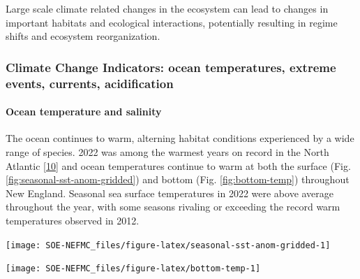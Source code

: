 \documentclass[
  10pt,
]{article}
\let\origfigure\figure
\let\endorigfigure\endfigure
\renewenvironment{figure}[1][2] {
    \expandafter\origfigure\expandafter[H]
} {
    \endorigfigure
}
\begin{document}
Large scale climate related changes in the ecosystem can lead to changes in important habitats and ecological interactions, potentially resulting in regime shifts and ecosystem reorganization.

\hypertarget{climate-change-indicators-ocean-temperatures-extreme-events-currents-acidification}{%
\subsubsection{Climate Change Indicators: ocean temperatures, extreme events, currents, acidification}\label{climate-change-indicators-ocean-temperatures-extreme-events-currents-acidification}}

\hypertarget{ocean-temperature-and-salinity}{%
\paragraph{Ocean temperature and salinity}\label{ocean-temperature-and-salinity}}

The ocean continues to warm, alterning habitat conditions experienced by a wide range of species. 2022 was among the warmest years on record in the North Atlantic {[}\protect\hyperlink{ref-cheng_another_2023}{10}{]} and ocean temperatures continue to warm at both the surface (Fig. \ref{fig:seasonal-sst-anom-gridded}) and bottom (Fig. \ref{fig:bottom-temp}) throughout New England. Seasonal sea surface temperatures in 2022 were above average throughout the year, with some seasons rivaling or exceeding the record warm temperatures observed in 2012.

\begin{figure}

{\centering \texttt{[image: SOE-NEFMC\_files/figure-latex/seasonal-sst-anom-gridded-1]} 

}

\caption{New England (EPUs outlined in grey) 2022 seasonal sea surface temperature (SST) anomalies. The anomalies are the difference between the 2022 seasonal means and the long-term (1991-2020) seasonal means.  Seasons are defined as: Jan-Mar for winter, Apr-Jun for spring, Jul-Sep for summer, and Oct-Dec for fall.}\label{fig:seasonal-sst-anom-gridded}
\end{figure}

\begin{figure}

{\centering \texttt{[image: SOE-NEFMC\_files/figure-latex/bottom-temp-1]} 

}

\caption{Annual Georges Bank and Gulf of Maine seasonal bottom temperature anomalies. (black = in-situ observations, red = modeled reanalysis).  Data from the last two years (open circles) are from a near-real-time model and are considered preliminary.}\label{fig:bottom-temp}
\end{figure}
\end{document}
